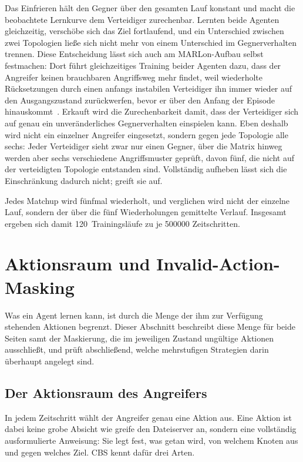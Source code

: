 Das Einfrieren hält den Gegner über den gesamten Lauf konstant und macht die
beobachtete Lernkurve dem Verteidiger zurechenbar. Lernten beide Agenten
gleichzeitig, verschöbe sich das Ziel fortlaufend, und ein Unterschied zwischen
zwei Topologien ließe sich nicht mehr von einem Unterschied im Gegnerverhalten
trennen. Diese Entscheidung lässt sich auch am MARLon-Aufbau selbst
festmachen: Dort führt gleichzeitiges Training beider Agenten dazu, dass der
Angreifer keinen brauchbaren Angriffsweg mehr findet, weil wiederholte
Rücksetzungen durch einen anfangs instabilen Verteidiger ihn immer wieder auf
den Ausgangszustand zurückwerfen, bevor er über den Anfang der Episode
hinauskommt~\autocite{marlon}. Erkauft wird die Zurechenbarkeit damit, dass der
Verteidiger sich auf genau ein unveränderliches Gegnerverhalten einspielen kann.
Eben deshalb wird nicht ein einzelner Angreifer eingesetzt, sondern gegen jede
Topologie alle sechs: Jeder Verteidiger sieht zwar nur einen Gegner, über die
Matrix hinweg werden aber sechs verschiedene Angriffsmuster geprüft, davon fünf,
die nicht auf der verteidigten Topologie entstanden sind. Vollständig aufheben
lässt sich die Einschränkung dadurch nicht;  greift sie auf.

Jedes Matchup wird fünfmal wiederholt, und verglichen wird nicht der einzelne
Lauf, sondern der über die fünf Wiederholungen gemittelte Verlauf. Insgesamt
ergeben sich damit \num{120}~Trainingsläufe zu je \num{500000} Zeitschritten.

\section{Aktionsraum und Invalid-Action-Masking}
\label{sec:masking}

Was ein Agent lernen kann, ist durch die Menge der ihm zur Verfügung
stehenden Aktionen begrenzt. Dieser Abschnitt beschreibt diese Menge für
beide Seiten samt der Maskierung, die im jeweiligen Zustand ungültige
Aktionen ausschließt, und prüft abschließend, welche mehrstufigen
Strategien darin überhaupt angelegt sind.

\subsection{Der Aktionsraum des Angreifers}
\label{sec:aktionsraum-atk}

In jedem Zeitschritt wählt der Angreifer genau eine Aktion aus. Eine Aktion ist
dabei keine grobe Absicht wie \glqq greife den Dateiserver an\grqq{}, sondern eine
vollständig ausformulierte Anweisung: Sie legt fest, was getan wird, von
welchem Knoten aus und gegen welches Ziel. \ac{CBS} kennt dafür drei Arten.

